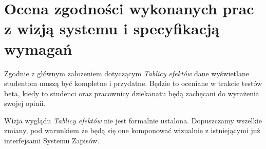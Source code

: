 \documentclass{article}
\begin{document}
\section{Ocena zgodności wykonanych prac z wizją systemu i specyfikacją wymagań}
Zgodnie z głównym założeniem dotyczącym \textit{Tablicy efektów} dane wyświetlane studentom muszą być kompletne i przydatne.
Będzie to oceniane w trakcie testów beta, kiedy to studenci oraz pracownicy dziekanatu będą zachęcani do wyrażenia swojej opinii.

Wizja wyglądu \textit{Tablicy efektów} nie jest formalnie ustalona.
Dopuszczamy wszelkie zmiany, pod warunkiem że będą się one komponować wizualnie z istniejącymi już interfejsami Systemu Zapisów.
\end{document}
